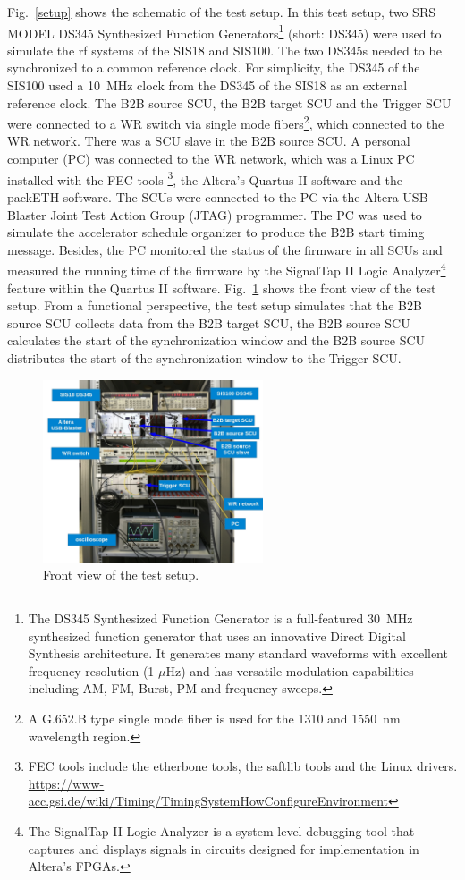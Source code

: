 Fig.~\ref{setup} shows the schematic of the test setup. In this test setup, two SRS MODEL DS345 Synthesized Function Generators\footnote{The DS345 Synthesized Function Generator is a full-featured \SI{30}{\MHz} synthesized function generator that uses an innovative Direct Digital Synthesis architecture. It generates many standard waveforms with excellent frequency resolution (1 $\mu$Hz) and has versatile modulation capabilities including AM, FM, Burst, PM and frequency sweeps.} (short: DS345) were used to simulate the rf systems of the SIS18 and SIS100. The two DS345s needed to be synchronized to a common reference clock. For simplicity, the DS345 of the SIS100 used a \SI{10}{\MHz} clock from the DS345 of the SIS18 as an external reference clock. The B2B source SCU, the B2B target SCU and the Trigger SCU were connected to a WR switch via single mode fibers\footnote{A G.652.B type single mode fiber is used for the 1310 and \SI{1550}{nm} wavelength region.}, which connected to the WR network. There was a SCU slave in the B2B source SCU. A personal computer (PC) was connected to the WR network, which was a Linux PC installed with the FEC tools \footnote{FEC tools include the etherbone tools, the saftlib tools and the Linux drivers. \\ \url{https://www-acc.gsi.de/wiki/Timing/TimingSystemHowConfigureEnvironment}}, the Altera's Quartus II software and the packETH software. The SCUs were connected to the PC via the Altera USB-Blaster Joint Test Action Group (JTAG) programmer. The PC was used to simulate the accelerator schedule organizer to produce the B2B start timing message. Besides, the PC monitored the status of the firmware in all SCUs and measured the running time of the firmware by the SignalTap II Logic Analyzer\footnote{The SignalTap II Logic Analyzer is a system-level debugging tool that captures and displays signals in circuits designed for implementation in Altera’s FPGAs.} feature within the Quartus II software. Fig.~\ref{testsetup_text} shows the front view of the test setup. From a functional perspective, the test setup simulates that the B2B source SCU collects data from the B2B target SCU, the B2B source SCU calculates the start of the synchronization window and the B2B source SCU distributes the start of the synchronization window to the Trigger SCU. 
\begin{figure}[!htb]
   \centering   
   \includegraphics*[width=65mm]{testsetup_text.jpg}
   \caption{Front view of the test setup.}
   \label{testsetup_text}
\end{figure}

